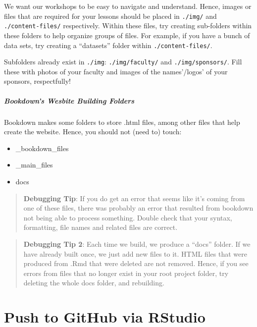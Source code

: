\documentclass[
]{book}
\providecommand{\tightlist}{%
  \setlength{\itemsep}{0pt}\setlength{\parskip}{0pt}}
\theoremstyle{definition}
\theoremstyle{definition}
\theoremstyle{definition}
\theoremstyle{definition}
\theoremstyle{remark}
\begin{document}
We want our workshops to be easy to navigate and understand. Hence, images or files that are required for your lessons should be placed in \texttt{./img/} and \texttt{./content-files/} respectively. Within these files, try creating sub-folders within these folders to help organize groups of files. For example, if you have a bunch of data sets, try creating a ``datasets'' folder within \texttt{./content-files/}.

Subfolders already exist in \texttt{./img}: \texttt{./img/faculty/} and \texttt{./img/sponsors/}. Fill these with photos of your faculty and images of the names'/logos' of your sponsors, respectfully!

\subparagraph*{\texorpdfstring{ Bookdown's Wesbite Building Folders }{ Bookdown's Wesbite Building Folders }}\label{bookdowns-wesbite-building-folders}

Bookdown makes some folders to store .html files, among other files that help create the website. Hence, you should not (need to) touch:

\begin{itemize}
\tightlist
\item
  \_bookdown\_files
\item
  \_main\_files
\item
  docs
\end{itemize}

\begin{quote}
\textbf{Debugging Tip}: If you do get an error that seems like it's coming from one of these files, there was probably an error that resulted from bookdown not being able to process something. Double check that your syntax, formatting, file names and related files are correct.
\end{quote}

\begin{quote}
\textbf{Debugging Tip 2}: Each time we build, we produce a ``docs'' folder. If we have already built once, we just add new files to it. HTML files that were produced from .Rmd that were deleted are not removed. Hence, if you see errors from files that no longer exist in your root project folder, try deleting the whole docs folder, and rebuilding.
\end{quote}

\section{Push to GitHub via RStudio}\label{push-to-github-via-rstudio}
\end{document}

